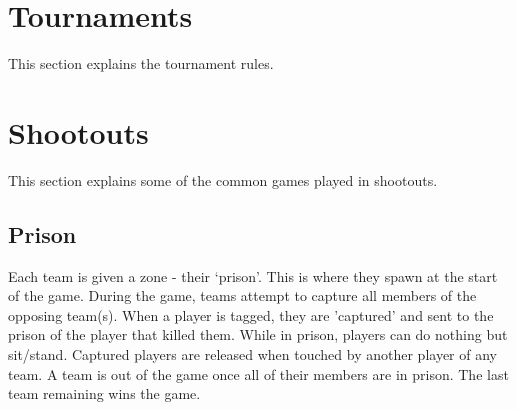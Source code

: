 \documentclass{article}
\begin{document}
\newpage
\section{Tournaments}
	This section explains the tournament rules.

\section{Shootouts}
\label{shootouts}
	This section explains some of the common games played in shootouts.
	
	
	\subsection{Prison}
		Each team is given a zone - their `prison'. This is where they spawn at the start of the game. During the game, teams attempt to capture all members of the opposing team(s). When a player is tagged, they are 'captured' and sent to the prison of the player that killed them. While in prison, players can do nothing but sit/stand. Captured players are released when touched by another player of any team. A team is out of the game once all of their members are in prison. The last team remaining wins the game.
	
\end{document}
